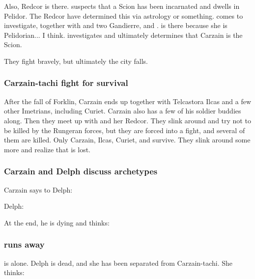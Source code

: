 \begin{garbage}
Also, Redcor \Matron{} \Esmerel{} is there. \Esmerel{} suspects that a Scion has been incarnated and dwells in Pelidor. The Redcor have determined this via astrology or something. \Esmerel{} comes to investigate, together with \Racel{} and two Gandierre, \France{} \Perival{} and \Isacc{} \Chiran. \Racel{} is there because she is Pelidorian... I think. 
\Esmerel{} investigates and ultimately determines that Carzain is the Scion. 

They fight bravely, but ultimately the city falls.





\subsubsection{Carzain-tachi fight for survival}
After the fall of Forklin, Carzain ends up together with Telcastora Ilcas and a few other Imetrians, including Curiet. Carzain also has a few of his soldier buddies along. Then they meet up with \Esmerel{} and her Redcor. They slink around and try not to be killed by the Rungeran forces, but they are forced into a fight, and several of them are killed. Only Carzain, Ilcas, Curiet, \Esmerel{} and \Racel{} survive. They slink around some more and realize that \Forklin{} is lost. 





\subsubsection{Carzain and Delph discuss archetypes}
Carzain says to Delph: 

Delph:

At the end, he is dying and thinks: 





\subsubsection{\Tsekkect{} runs away}
\Tsekkect{} is alone. 
Delph is dead, and she has been separated from Carzain-tachi. 
She thinks:


\end{garbage}
